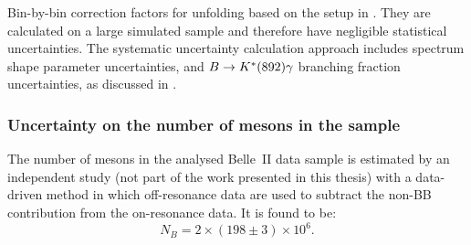 \begin{table}[htbp!]
    \centering
    
    \caption{\label{tab:unfolding_uncertainties} Bin-by-bin correction factors for unfolding based on the setup in . 
    They are calculated on a large simulated sample and therefore have negligible statistical uncertainties.
    The systematic uncertainty calculation approach includes \EB spectrum shape parameter uncertainties, 
    \BtoXsgamma and $B\rightarrow K^*(892)\gamma$ branching fraction uncertainties, as discussed in  .
    }

    
\end{table}

\subsubsection{Uncertainty on the number of \texorpdfstring{\B}{B} mesons in the sample}\label{sec:b_meson_uncertainty}

The number of \B mesons in the analysed Belle~II data sample is estimated by an independent study (not part of the work presented in this thesis)
with a data-driven method in which off-resonance data are used to subtract the non-BB contribution from the on-resonance data.
It is found to be:
\begin{equation}\label{eq:b_meson_count}
    N_B = 2\times(198\pm3)\times10^6.
\end{equation}
